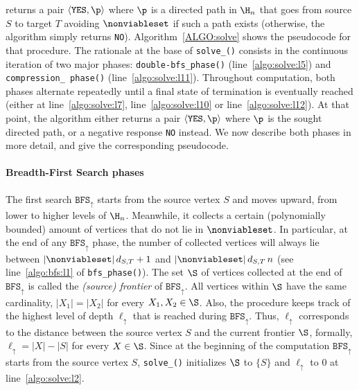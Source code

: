 returns a pair $\langle \texttt{YES}, \p\rangle$ where $\p$ is a directed path in $\H_n$ that goes from source $S$ to target $T$
avoiding $\nonviableset$ if such a path exists (otherwise, the algorithm simply returns \texttt{NO}).
Algorithm~\ref{ALGO:solve} shows the pseudocode for that procedure.
The rationale at the base of \texttt{solve\_\mainproblem()} consists in the continuous iteration of two major phases:
\texttt{double-bfs\_phase()} (line~\ref{algo:solve:l5})
and
\texttt{compression\_ phase()} (line~\ref{algo:solve:l11}).
Throughout computation, both phases alternate repeatedly
until a final state of termination is eventually reached
(either at line~\ref{algo:solve:l7}, line~\ref{algo:solve:l10} or line~\ref{algo:solve:l12}).
At that point, the algorithm either returns a pair $\langle \texttt{YES},
\p \rangle$ where $\p$ is the sought directed path, or a negative response \texttt{NO} instead.
We now describe both phases in more detail, and give the corresponding pseudocode.

\paragraph{Breadth-First Search phases}
The first search $\texttt{BFS}_\uparrow$ starts from the source vertex $S$ and moves upward,
from lower to higher levels of $\H_n$.
Meanwhile, it collects a certain (polynomially bounded) amount of vertices that do not lie in $\nonviableset$.
In particular, at the end of any $\texttt{BFS}_\uparrow$ phase,
the number of collected vertices will always
lie between $|\nonviableset|\, d_{S,T} + 1$ and $|\nonviableset|\, d_{S,T}\,n$
(see line~\ref{algo:bfs:l1} of \texttt{bfs\_phase()}).
The set $\S$ of vertices collected at the end of $\texttt{BFS}_\uparrow$ is called the \emph{(source) frontier} of $\texttt{BFS}_\uparrow$.
All vertices within $\S$ have the same cardinality, \ie $|X_1|=|X_2|$ for every $X_1,X_2\in \S$.
Also, the procedure keeps track of the highest level of depth $\ell_\uparrow$ that is reached during $\texttt{BFS}_\uparrow$.
Thus, $\ell_\uparrow$ corresponds to the distance between the source vertex $S$ and
the current frontier $\S$,
formally, $\ell_\uparrow = |X|-|S|$ for every $X\in \S$.
Since at the beginning of the computation $\texttt{BFS}_\uparrow$ starts from the source vertex $S$,
\texttt{solve\_\mainproblem()} initializes $\S$ to $\{S\}$ and $\ell_\uparrow$ to $0$ at line~\ref{algo:solve:l2}.


